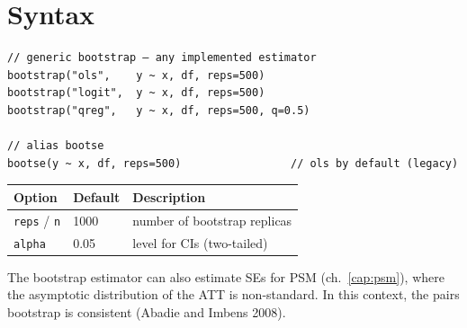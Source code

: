 \section{Syntax}

\begin{lstlisting}
// generic bootstrap — any implemented estimator
bootstrap("ols",    y ~ x, df, reps=500)
bootstrap("logit",  y ~ x, df, reps=500)
bootstrap("qreg",   y ~ x, df, reps=500, q=0.5)

// alias bootse
bootse(y ~ x, df, reps=500)                 // ols by default (legacy)
\end{lstlisting}

\begin{center}
\begin{tabular}{lll}
\toprule
\textbf{Option} & \textbf{Default} & \textbf{Description} \\
\midrule
\texttt{reps} / \texttt{n}  & 1000 & number of bootstrap replicas \\
\texttt{alpha}               & 0.05 & level for CIs (two-tailed) \\
\bottomrule
\end{tabular}
\end{center}

\begin{nota}
  The bootstrap estimator can also estimate SEs for PSM (ch.~\ref{cap:psm}),
  where the asymptotic distribution of the ATT is non-standard. In this context,
  the pairs bootstrap is consistent (Abadie and Imbens 2008).
\end{nota}
